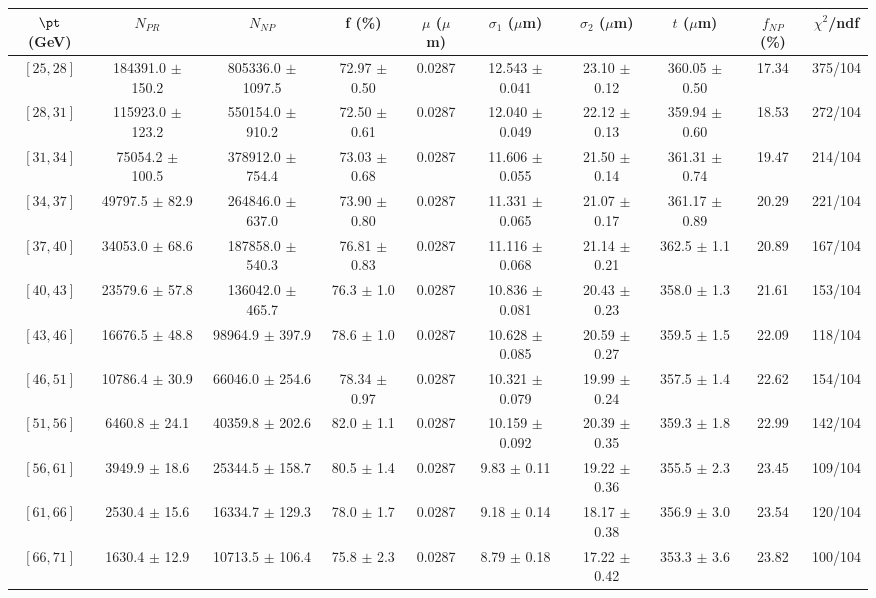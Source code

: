 \begin{tabular}{c||c|c|c|c|c|c|c||c|c}
$\pt$ (GeV) & $N_{PR}$ & $N_{NP}$ & f (\%) & $\mu$ ($\mu$m) & $\sigma_1$ ($\mu$m) & $\sigma_2$ ($\mu$m)  & $t$ ($\mu$m) & $f_{NP}$ (\%) & $\chi^2$/ndf \\
\hline
$[25, 28]$ & 184391.0 $\pm$ 150.2 & 805336.0 $\pm$ 1097.5 & 72.97 $\pm$ 0.50 & 0.0287 & 12.543 $\pm$ 0.041 & 23.10 $\pm$ 0.12 & 360.05 $\pm$ 0.50 & 17.34 & 375/104\\
$[28, 31]$ & 115923.0 $\pm$ 123.2 & 550154.0 $\pm$ 910.2 & 72.50 $\pm$ 0.61 & 0.0287 & 12.040 $\pm$ 0.049 & 22.12 $\pm$ 0.13 & 359.94 $\pm$ 0.60 & 18.53 & 272/104\\
$[31, 34]$ & 75054.2 $\pm$ 100.5 & 378912.0 $\pm$ 754.4 & 73.03 $\pm$ 0.68 & 0.0287 & 11.606 $\pm$ 0.055 & 21.50 $\pm$ 0.14 & 361.31 $\pm$ 0.74 & 19.47 & 214/104\\
$[34, 37]$ & 49797.5 $\pm$ 82.9 & 264846.0 $\pm$ 637.0 & 73.90 $\pm$ 0.80 & 0.0287 & 11.331 $\pm$ 0.065 & 21.07 $\pm$ 0.17 & 361.17 $\pm$ 0.89 & 20.29 & 221/104\\
$[37, 40]$ & 34053.0 $\pm$ 68.6 & 187858.0 $\pm$ 540.3 & 76.81 $\pm$ 0.83 & 0.0287 & 11.116 $\pm$ 0.068 & 21.14 $\pm$ 0.21 & 362.5 $\pm$ 1.1 & 20.89 & 167/104\\
$[40, 43]$ & 23579.6 $\pm$ 57.8 & 136042.0 $\pm$ 465.7 & 76.3 $\pm$ 1.0 & 0.0287 & 10.836 $\pm$ 0.081 & 20.43 $\pm$ 0.23 & 358.0 $\pm$ 1.3 & 21.61 & 153/104\\
$[43, 46]$ & 16676.5 $\pm$ 48.8 & 98964.9 $\pm$ 397.9 & 78.6 $\pm$ 1.0 & 0.0287 & 10.628 $\pm$ 0.085 & 20.59 $\pm$ 0.27 & 359.5 $\pm$ 1.5 & 22.09 & 118/104\\
$[46, 51]$ & 10786.4 $\pm$ 30.9 & 66046.0 $\pm$ 254.6 & 78.34 $\pm$ 0.97 & 0.0287 & 10.321 $\pm$ 0.079 & 19.99 $\pm$ 0.24 & 357.5 $\pm$ 1.4 & 22.62 & 154/104\\
$[51, 56]$ & 6460.8 $\pm$ 24.1 & 40359.8 $\pm$ 202.6 & 82.0 $\pm$ 1.1 & 0.0287 & 10.159 $\pm$ 0.092 & 20.39 $\pm$ 0.35 & 359.3 $\pm$ 1.8 & 22.99 & 142/104\\
$[56, 61]$ & 3949.9 $\pm$ 18.6 & 25344.5 $\pm$ 158.7 & 80.5 $\pm$ 1.4 & 0.0287 & 9.83 $\pm$ 0.11 & 19.22 $\pm$ 0.36 & 355.5 $\pm$ 2.3 & 23.45 & 109/104\\
$[61, 66]$ & 2530.4 $\pm$ 15.6 & 16334.7 $\pm$ 129.3 & 78.0 $\pm$ 1.7 & 0.0287 & 9.18 $\pm$ 0.14 & 18.17 $\pm$ 0.38 & 356.9 $\pm$ 3.0 & 23.54 & 120/104\\
$[66, 71]$ & 1630.4 $\pm$ 12.9 & 10713.5 $\pm$ 106.4 & 75.8 $\pm$ 2.3 & 0.0287 & 8.79 $\pm$ 0.18 & 17.22 $\pm$ 0.42 & 353.3 $\pm$ 3.6 & 23.82 & 100/104\\

\end{tabular}
